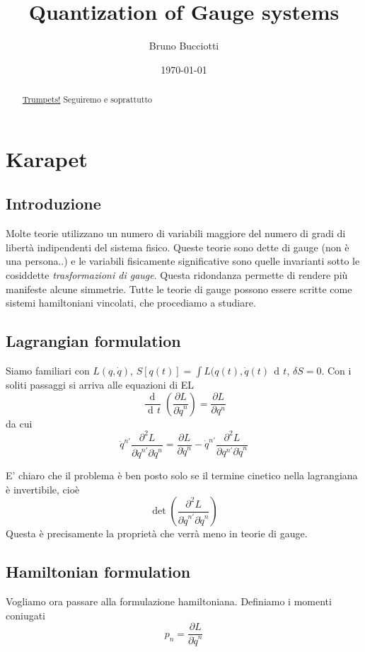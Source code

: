 \documentclass[a4paper, 11pt]{article}
\date{\today}
\author{Bruno Bucciotti}
\title{Quantization of Gauge systems}
\newcommand{\dd}{\mathop{\mathrm{d}\!}{}}
\newcommand{\deriv}[2]{\dfrac{\dd #1}{\dd #2}}
\newcommand{\pderiv}[2]{\dfrac{\partial #1}{\partial #2}}
\begin{document}
	\maketitle
	
	\begin{abstract}
		\href{https://www.youtube.com/watch?v=IwInqrN_auU}{Trumpets!}
		Seguiremo \cite{dirac} e soprattutto \cite{HT}
		
	\end{abstract}

	\tableofcontents
	\clearpage
	\section{Karapet}
	\subsection{Introduzione}
	Molte teorie utilizzano un numero di variabili maggiore del numero di gradi di libertà indipendenti del sistema fisico.
	Queste teorie sono dette di gauge (non è una persona..) e le variabili fisicamente significative sono quelle invarianti sotto le cosiddette \emph{trasformazioni di gauge}. Questa ridondanza permette di rendere più manifeste alcune simmetrie. Tutte le teorie di gauge possono essere scritte come sistemi hamiltoniani vincolati, che procediamo a studiare.
	
	\subsection{Lagrangian formulation}
	Siamo familiari con $L(q,\dot{q})$, $S[q(t)] = \int L(q(t), \dot{q}(t)\, \dd t$, $\delta S=0$. Con i soliti passaggi si arriva alle equazioni di EL
	\[ \deriv{}{t} \left( \pderiv{L}{\dot{q}^n} \right) = \pderiv{L}{q^n} \]
	da cui
	\[ \ddot{q}^{n'} \pderiv{^2 L}{\dot{q}^{n'}\partial\dot{q}^n} = \pderiv{L}{\dot{q}^n} - \dot{q}^{n'} \pderiv{^2 L}{q^{n'}\partial\dot{q}^n} \]
	
	E' chiaro che il problema è ben posto solo se il termine cinetico nella lagrangiana è invertibile, cioè
	\[ \det\left( \pderiv{^2L}{\dot{q}^{n'}\partial\dot{q}^{n}} \right) \]
	Questa è precisamente la proprietà che verrà meno in teorie di gauge.
	
	\subsection{Hamiltonian formulation}
	Vogliamo ora passare alla formulazione hamiltoniana. Definiamo i momenti coniugati
	\[ p_n = \pderiv{L}{\dot{q}^{n}} \]
	
\end{document}

